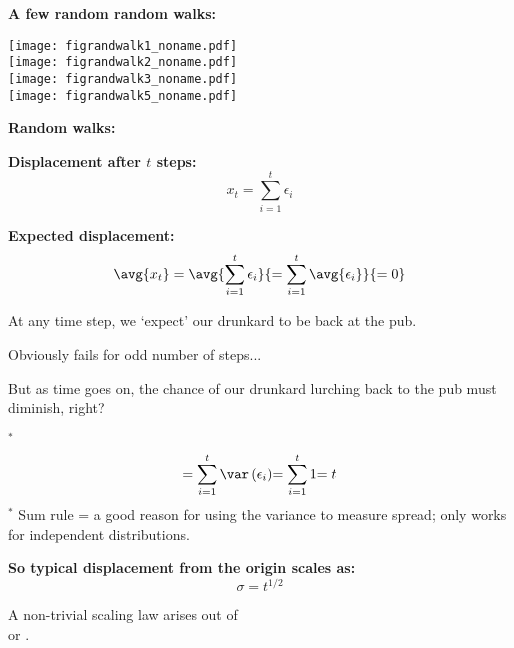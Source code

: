   


  \textbf{A few random random walks:}

  
    \texttt{[image: figrandwalk1\_noname.pdf]}\\
    \texttt{[image: figrandwalk2\_noname.pdf]}\\
    \texttt{[image: figrandwalk3\_noname.pdf]}\\
    \texttt{[image: figrandwalk5\_noname.pdf]}
  


  \textbf{Random walks:}

  \textbf{Displacement after $t$ steps:}
    $$x_t = \sum_{i=1}^{t} \epsilon_i$$  
  

  \medskip

  \textbf{Expected displacement:}
    $$
    \avg{x_t} = \avg{\sum_{i=1}^{t} \epsilon_i}
    {= \sum_{i=1}^{t} \avg{\epsilon_i}}
    {= 0}
    $$
    
    
      At any time step, we `expect' our drunkard to be back at the pub.
    
      Obviously fails for odd number of steps...
    
      But as time goes on, the chance of our drunkard lurching back
      to the pub must diminish, right?
    
  



  \textbf{$^*$}
    $$
    {= \sum_{i=1}^{t} \var\left(  \epsilon_i \right) }
    {= \sum_{i=1}^{t} 1}
    {= t }
    $$
    {\small $^*$ Sum rule = a good reason for using the variance to measure spread; 
      only works for independent distributions.}
  

  \textbf{So typical displacement from the origin scales as:}
    $$\boxed{\sigma = t^{1/2}}$$
    
     
      A non-trivial scaling law arises out of\\
      \qquad {} or .
    
  
  




